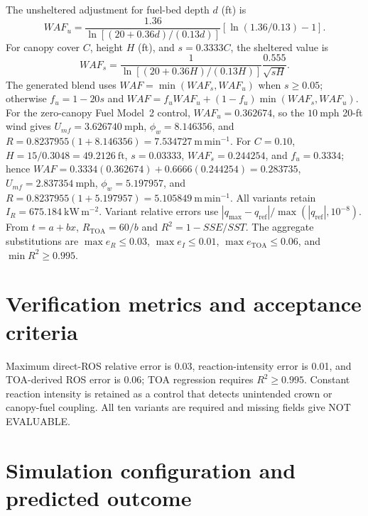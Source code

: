 The unsheltered adjustment for fuel-bed depth \(d\) (ft) is
\[
 WAF_u=\frac{1.36}{\ln[(20+0.36d)/(0.13d)]}
       \left[\ln(1.36/0.13)-1\right].
\]
For canopy cover \(C\), height \(H\) (ft), and \(s=0.3333C\), the
sheltered value is
\[
 WAF_s=\frac{1}{\ln[(20+0.36H)/(0.13H)]}
       \frac{0.555}{\sqrt{sH}}.
\]
The generated blend uses \(WAF=\min(WAF_s,WAF_u)\) when \(s\geq0.05\);
otherwise \(f_u=1-20s\) and
\(WAF=f_uWAF_u+(1-f_u)\min(WAF_s,WAF_u)\).
For the zero-canopy Fuel Model~2 control, \(WAF_u=0.362674\), so the
\(10~\mathrm{mph}\) 20-ft wind gives \(U_{mf}=3.626740~\mathrm{mph}\),
\(\phi_w=8.146356\), and
\(R=0.8237955(1+8.146356)=7.534727~\mathrm{m\,min^{-1}}\).
For \(C=0.10\), \(H=15/0.3048=49.2126~\mathrm{ft}\),
\(s=0.03333\), \(WAF_s=0.244254\), and \(f_u=0.3334\); hence
\(WAF=0.3334(0.362674)+0.6666(0.244254)=0.283735\),
\(U_{mf}=2.837354~\mathrm{mph}\), \(\phi_w=5.197957\), and
\(R=0.8237955(1+5.197957)=5.105849~\mathrm{m\,min^{-1}}\).
All variants retain \(I_R=675.184~\mathrm{kW\,m^{-2}}\).
Variant relative errors use
\(|q_{\max}-q_{\mathrm{ref}}|/\max(|q_{\mathrm{ref}}|,10^{-8})\).
From \(t=a+bx\), \(R_{\mathrm{TOA}}=60/b\) and
\(R^2=1-SSE/SST\).  The aggregate substitutions are
\(\max e_R\leq0.03\), \(\max e_I\leq0.01\),
\(\max e_{\mathrm{TOA}}\leq0.06\), and \(\min R^2\geq0.995\).

\section{Verification metrics and acceptance criteria}
Maximum direct-ROS relative error is 0.03, reaction-intensity error is 0.01, and TOA-derived ROS error is 0.06; TOA regression requires $R^2\ge0.995$.  Constant reaction intensity is retained as a control that detects unintended crown or canopy-fuel coupling.  All ten variants are required and missing fields give NOT EVALUABLE.

\section{Simulation configuration and predicted outcome}

